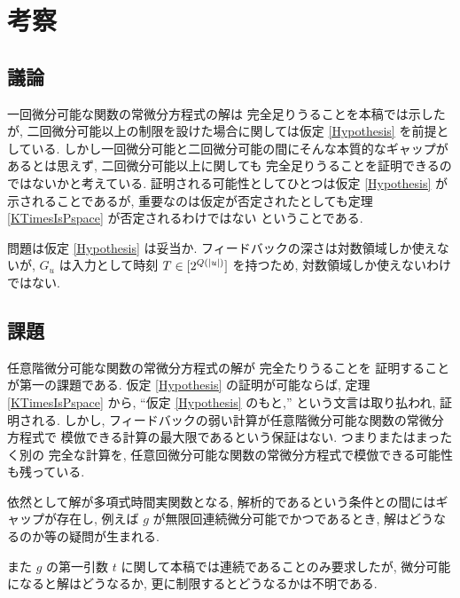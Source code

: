 \section{考察}


\subsection{議論}
一回微分可能な関数の常微分方程式の解は \PSPACE 完全足りうることを本稿では示したが,
二回微分可能以上の制限を設けた場合に関しては仮定 \ref{Hypothesis} を前提としている.
しかし一回微分可能と二回微分可能の間にそんな本質的なギャップがあるとは思えず,
二回微分可能以上に関しても \PSPACE 完全足りうることを証明できるのではないかと考えている.
証明される可能性としてひとつは仮定 \ref{Hypothesis} が示されることであるが,
重要なのは仮定が否定されたとしても定理 \ref{KTimesIsPspace} が否定されるわけではない
ということである.

問題は仮定 \ref{Hypothesis} は妥当か.
フィードバックの深さは対数領域しか使えないが, $G_u$ は入力として時刻 $T \in [2^{Q(|u|)}]$
を持つため, 対数領域しか使えないわけではない.


\subsection{課題}


任意階微分可能な関数の常微分方程式の解が \PSPACE 完全たりうることを
証明することが第一の課題である.
仮定 \ref{Hypothesis} の証明が可能ならば, 定理 \ref{KTimesIsPspace} から,
``仮定 \ref{Hypothesis} のもと,'' という文言は取り払われ, 証明される.
しかし, フィードバックの弱い計算が任意階微分可能な関数の常微分方程式で
模倣できる計算の最大限であるという保証はない.
つまりまたはまったく別の \PSPACE 完全な計算を,
任意回微分可能な関数の常微分方程式で模倣できる可能性も残っている.

依然として解が多項式時間実関数となる, 解析的であるという条件との間にはギャップが存在し,
例えば $g$ が無限回連続微分可能でかつであるとき, 解はどうなるのか等の疑問が生まれる.

また $g$ の第一引数 $t$ に関して本稿では連続であることのみ要求したが,
微分可能になると解はどうなるか, 更に制限するとどうなるかは不明である.



